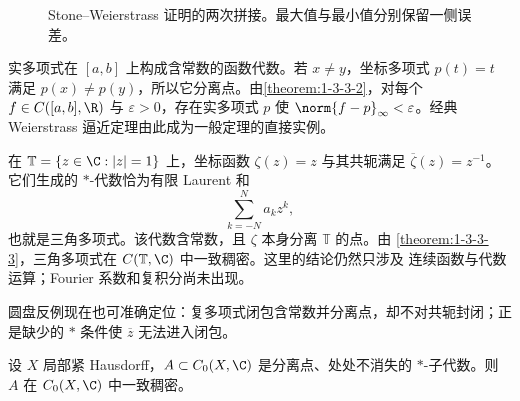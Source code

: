 \begin{figure}[htbp]
\centering
{}
\caption{Stone--Weierstrass 证明的两次拼接。最大值与最小值分别保留一侧误差。}
\label{fig:1-3-3-stone-weierstrass}
\end{figure}

\begin{example}[区间多项式]\label{ex:1-3-3-1}
实多项式在 $[a,b]$ 上构成含常数的函数代数。若 $x\ne y$，坐标多项式 $p(t)=t$ 满足
$p(x)\ne p(y)$，所以它分离点。由\cref{theorem:1-3-3-2}，对每个
$f\in C([a,b],\R)$ 与 $\varepsilon>0$，存在实多项式 $p$ 使
$\norm{f-p}_\infty<\varepsilon$。经典 Weierstrass 逼近定理由此成为一般定理的直接实例。
\end{example}

\begin{example}[三角多项式]\label{ex:1-3-3-2}
在 $\mathbb T=\{z\in\C:|z|=1\}$ 上，坐标函数 $\zeta(z)=z$ 与其共轭满足
$\overline\zeta(z)=z^{-1}$。它们生成的 $*$-代数恰为有限 Laurent 和
\[
  \sum_{k=-N}^Na_kz^k,
\]
也就是三角多项式。该代数含常数，且 $\zeta$ 本身分离 $\mathbb T$ 的点。由
\cref{theorem:1-3-3-3}，三角多项式在 $C(\mathbb T,\C)$ 中一致稠密。这里的结论仍然只涉及
连续函数与代数运算；Fourier 系数和复积分尚未出现。
\end{example}

圆盘反例现在也可准确定位：复多项式闭包含常数并分离点，却不对共轭封闭；正是缺少的 $*$ 条件使
$\overline z$ 无法进入闭包。

\begin{theorem}\label{theorem:1-3-3-4}
设 $X$ 局部紧 Hausdorff，$A\subset C_0(X,\C)$ 是分离点、处处不消失的 $*$-子代数。则 $A$ 在
$C_0(X,\C)$ 中一致稠密。
\end{theorem}

